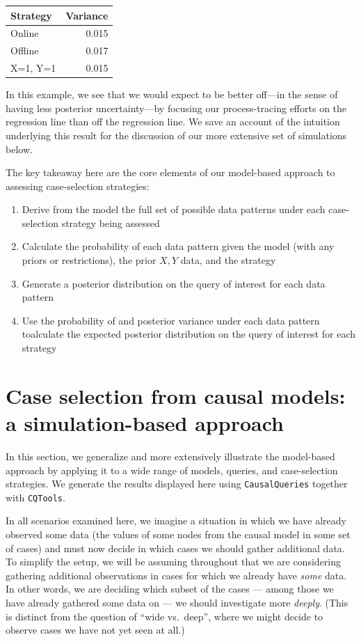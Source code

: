 \documentclass[
  12pt,
]{book}
\providecommand{\tightlist}{%
  \setlength{\itemsep}{0pt}\setlength{\parskip}{0pt}}
\begin{document}
\begin{tabular}{l|r}
\hline
Strategy & Variance\\
\hline
Online & 0.015\\
\hline
Offline & 0.017\\
\hline
X=1, Y=1 & 0.015\\
\hline
\end{tabular}

In this example, we see that we would expect to be better off---in the sense of having less posterior uncertainty---by focusing our process-tracing efforts on the regression line than off the regression line. We save an account of the intuition underlying this result for the discussion of our more extensive set of simulations below.

The key takeaway here are the core elements of our model-based approach to assessing case-selection strategies:

\begin{enumerate}
\def\labelenumi{\arabic{enumi}.}
\tightlist
\item
  Derive from the model the full set of possible data patterns under each case-selection strategy being assessed
\item
  Calculate the probability of each data pattern given the model (with any priors or restrictions), the prior \(X,Y\) data, and the strategy
\item
  Generate a posterior distribution on the query of interest for each data pattern
\item
  Use the probability of and posterior variance under each data pattern toalculate the expected posterior distribution on the query of interest for each strategy
\end{enumerate}

\hypertarget{case-selection-from-causal-models-a-simulation-based-approach}{%
\section{Case selection from causal models: a simulation-based approach}\label{case-selection-from-causal-models-a-simulation-based-approach}}

In this section, we generalize and more extensively illustrate the model-based approach by applying it to a wide range of models, queries, and case-selection strategies. We generate the results displayed here using \texttt{CausalQueries} together with \texttt{CQTools}.

In all scenarios examined here, we imagine a situation in which we have already observed some data (the values of some nodes from the causal model in some set of cases) and must now decide in which cases we should gather additional data. To simplify the setup, we will be assuming throughout that we are considering gathering additional observations in cases for which we already have \emph{some} data. In other words, we are deciding which subset of the cases --- among those we have already gathered some data on --- we should investigate more \emph{deeply}. (This is distinct from the question of ``wide vs.~deep'', where we might decide to observe cases we have not yet seen at all.)
\end{document}
